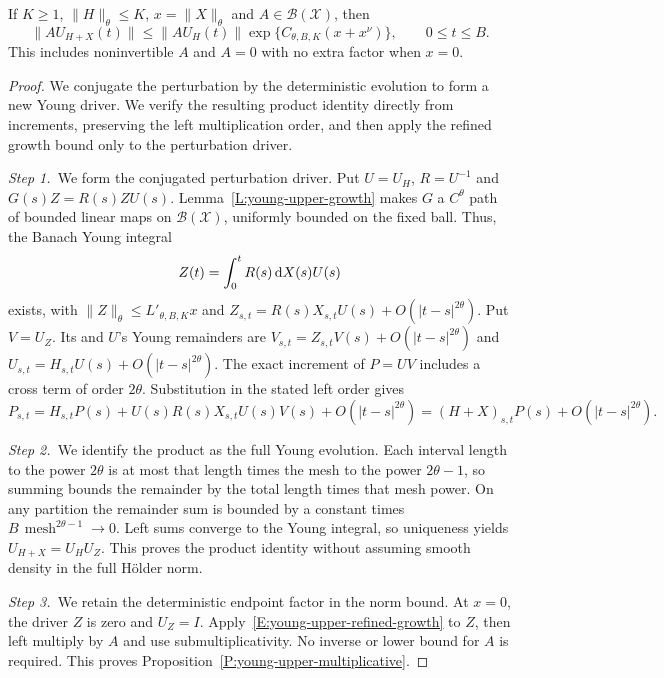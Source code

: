 \begin{proposition}
  \label{P:young-upper-multiplicative}
  If $K \ge 1$, $\|H\|_\theta \le K$, $x = \|X\|_\theta$ and $A \in
  \mathcal{B}(\mathcal{X})$, then
  \begin{equation}\label{E:young-upper-multiplicative}
    \|AU_{H+X}(t)\|
    \le\|AU_H(t)\|\exp\{C_{\theta,B,K}(x+x^\nu)\},
    \qquad 0\le t\le B.
  \end{equation}
  This includes noninvertible $A$ and $A = 0$ with no extra factor when $x = 0$.
\end{proposition}

\begin{proof}
  We conjugate the perturbation by the deterministic evolution to form a new
  Young driver. We verify the resulting product identity directly from
  increments, preserving the left multiplication order, and then apply the
  refined growth bound only to the perturbation driver.


  \medskip
  \noindent\textit{Step 1.~}We form the conjugated perturbation driver.
  Put $U = U_H$, $R = U^{-1}$ and $G(s)Z = R(s)ZU(s)$.
  Lemma~\ref{L:young-upper-growth} makes $G$ a $C^\theta$ path of bounded linear
  maps on $\mathcal{B}(\mathcal{X})$, uniformly bounded on the fixed ball. Thus,
  the Banach Young integral
  \[
    Z(t)=\int_0^tR(s)\,\mathrm{d} X(s)U(s)
  \]
  exists, with $\|Z\|_\theta \le L'_{\theta,B,K}x$ and $Z_{s,t} =
  R(s)X_{s,t}U(s)+O(|t-s|^{2\theta})$. Put $V = U_Z$. Its and $U$'s Young
  remainders are $V_{s,t} = Z_{s,t}V(s)+O(|t-s|^{2\theta})$ and $U_{s,t} =
  H_{s,t}U(s)+O(|t-s|^{2\theta})$. The exact increment of $P = UV$ includes a
  cross term of order $2\theta$. Substitution in the stated left order gives
  \[
    P_{s,t}
    =H_{s,t}P(s)+U(s)R(s)X_{s,t}U(s)V(s)
    +O(|t-s|^{2\theta})
    =(H+X)_{s,t}P(s)+O(|t-s|^{2\theta}).
  \]

  \medskip
  \noindent\textit{Step 2.~}We identify the product as the full Young
  evolution.
  Each interval length to the power $2\theta$ is at most that length times the
  mesh to the power $2\theta-1$, so summing bounds the remainder by the total
  length times that mesh power.
  On any partition the remainder sum is bounded by a constant times
  $B\,\operatorname{mesh}^{2\theta-1} \to 0$. Left sums converge to the Young
  integral, so uniqueness yields $U_{H+X} = U_HU_Z$. This proves the product
  identity without assuming smooth density in the full H\"older norm.

  \medskip
  \noindent\textit{Step 3.~}We retain the deterministic endpoint factor in the
  norm bound.
  At $x=0$, the driver $Z$ is zero and $U_Z=I$.
  Apply~\eqref{E:young-upper-refined-growth} to $Z$, then left multiply by $A$
  and use submultiplicativity. No inverse or lower bound for $A$ is required.
  This proves Proposition~\ref{P:young-upper-multiplicative}.
\end{proof}
